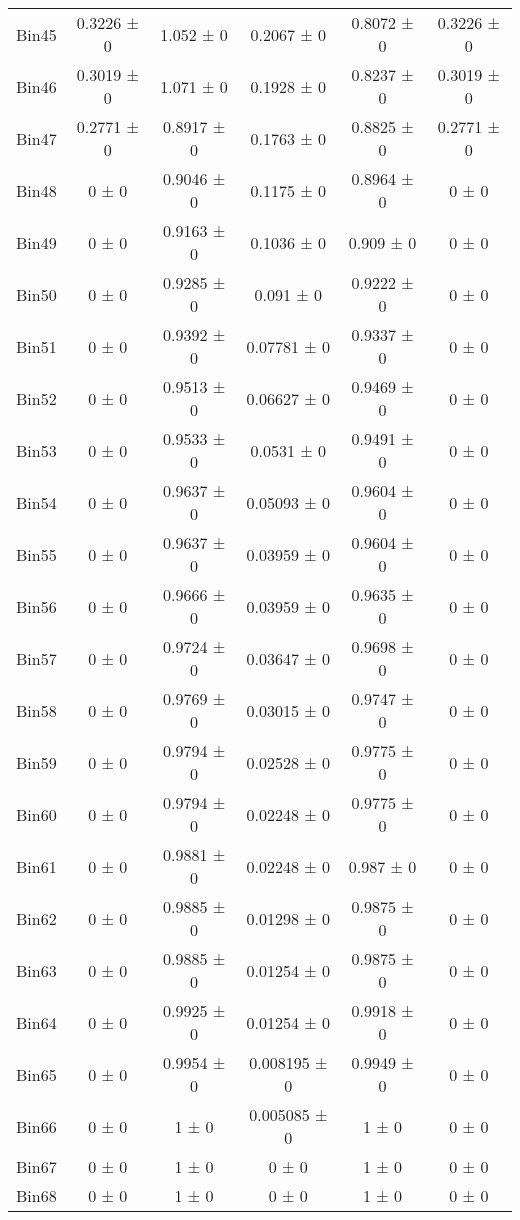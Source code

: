 \begin{tabular}{@{\extracolsep{4pt}}lccccc@{}}
     Bin45 & 0.3226 ± 0 & 1.052 ± 0 & 0.2067 ± 0 & 0.8072 ± 0 & 0.3226 ± 0 \\ 
     Bin46 & 0.3019 ± 0 & 1.071 ± 0 & 0.1928 ± 0 & 0.8237 ± 0 & 0.3019 ± 0 \\ 
     Bin47 & 0.2771 ± 0 & 0.8917 ± 0 & 0.1763 ± 0 & 0.8825 ± 0 & 0.2771 ± 0 \\ 
     Bin48 & 0 ± 0 & 0.9046 ± 0 & 0.1175 ± 0 & 0.8964 ± 0 & 0 ± 0 \\ 
     Bin49 & 0 ± 0 & 0.9163 ± 0 & 0.1036 ± 0 & 0.909 ± 0 & 0 ± 0 \\ 
     Bin50 & 0 ± 0 & 0.9285 ± 0 & 0.091 ± 0 & 0.9222 ± 0 & 0 ± 0 \\ 
     Bin51 & 0 ± 0 & 0.9392 ± 0 & 0.07781 ± 0 & 0.9337 ± 0 & 0 ± 0 \\ 
     Bin52 & 0 ± 0 & 0.9513 ± 0 & 0.06627 ± 0 & 0.9469 ± 0 & 0 ± 0 \\ 
     Bin53 & 0 ± 0 & 0.9533 ± 0 & 0.0531 ± 0 & 0.9491 ± 0 & 0 ± 0 \\ 
     Bin54 & 0 ± 0 & 0.9637 ± 0 & 0.05093 ± 0 & 0.9604 ± 0 & 0 ± 0 \\ 
     Bin55 & 0 ± 0 & 0.9637 ± 0 & 0.03959 ± 0 & 0.9604 ± 0 & 0 ± 0 \\ 
     Bin56 & 0 ± 0 & 0.9666 ± 0 & 0.03959 ± 0 & 0.9635 ± 0 & 0 ± 0 \\ 
     Bin57 & 0 ± 0 & 0.9724 ± 0 & 0.03647 ± 0 & 0.9698 ± 0 & 0 ± 0 \\ 
     Bin58 & 0 ± 0 & 0.9769 ± 0 & 0.03015 ± 0 & 0.9747 ± 0 & 0 ± 0 \\ 
     Bin59 & 0 ± 0 & 0.9794 ± 0 & 0.02528 ± 0 & 0.9775 ± 0 & 0 ± 0 \\ 
     Bin60 & 0 ± 0 & 0.9794 ± 0 & 0.02248 ± 0 & 0.9775 ± 0 & 0 ± 0 \\ 
     Bin61 & 0 ± 0 & 0.9881 ± 0 & 0.02248 ± 0 & 0.987 ± 0 & 0 ± 0 \\ 
     Bin62 & 0 ± 0 & 0.9885 ± 0 & 0.01298 ± 0 & 0.9875 ± 0 & 0 ± 0 \\ 
     Bin63 & 0 ± 0 & 0.9885 ± 0 & 0.01254 ± 0 & 0.9875 ± 0 & 0 ± 0 \\ 
     Bin64 & 0 ± 0 & 0.9925 ± 0 & 0.01254 ± 0 & 0.9918 ± 0 & 0 ± 0 \\ 
     Bin65 & 0 ± 0 & 0.9954 ± 0 & 0.008195 ± 0 & 0.9949 ± 0 & 0 ± 0 \\ 
     Bin66 & 0 ± 0 & 1 ± 0 & 0.005085 ± 0 & 1 ± 0 & 0 ± 0 \\ 
     Bin67 & 0 ± 0 & 1 ± 0 & 0 ± 0 & 1 ± 0 & 0 ± 0 \\ 
     Bin68 & 0 ± 0 & 1 ± 0 & 0 ± 0 & 1 ± 0 & 0 ± 0 \\ 

\end{tabular}

